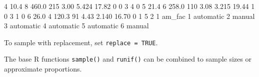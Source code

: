 \documentclass[
]{book}
\newenvironment{Shaded}{\begin{snugshade}}{\end{snugshade}}
\newcommand{\DecValTok}[1]{\textcolor[rgb]{0.00,0.00,0.81}{#1}}
\newcommand{\FloatTok}[1]{\textcolor[rgb]{0.00,0.00,0.81}{#1}}
\newcommand{\NormalTok}[1]{#1}
\begin{document}
\begin{Shaded}
\begin{Highlighting}[]
\DecValTok{4} \FloatTok{10.4}         \DecValTok{8} \FloatTok{460.0} \DecValTok{215}       \FloatTok{3.00}  \FloatTok{5.424} \FloatTok{17.82}      \DecValTok{0}  \DecValTok{0}    \DecValTok{3}    \DecValTok{4}     \DecValTok{0}
\DecValTok{5} \FloatTok{21.4}         \DecValTok{6} \FloatTok{258.0} \DecValTok{110}       \FloatTok{3.08}  \FloatTok{3.215} \FloatTok{19.44}      \DecValTok{1}  \DecValTok{0}    \DecValTok{3}    \DecValTok{1}     \DecValTok{0}
\DecValTok{6} \FloatTok{26.0}         \DecValTok{4} \FloatTok{120.3}  \DecValTok{91}       \FloatTok{4.43}  \FloatTok{2.140} \FloatTok{16.70}      \DecValTok{0}  \DecValTok{1}    \DecValTok{5}    \DecValTok{2}     \DecValTok{1}
\NormalTok{     am\_fac}
\DecValTok{1}\NormalTok{ automatic}
\DecValTok{2}\NormalTok{    manual}
\DecValTok{3}\NormalTok{ automatic}
\DecValTok{4}\NormalTok{ automatic}
\DecValTok{5}\NormalTok{ automatic}
\DecValTok{6}\NormalTok{    manual}
\end{Highlighting}
\end{Shaded}

To sample with replacement, set \texttt{replace\ =\ TRUE}.

The base R functions \texttt{sample()} and \texttt{runif()} can be combined to sample sizes or approximate proportions.
\end{document}
